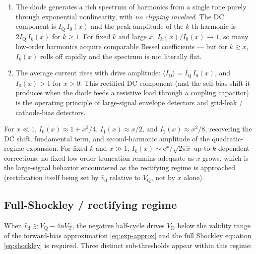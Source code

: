 \documentclass[12pt]{article}
\newcommand{\ID}{I_{\mathrm{D}}}
\newcommand{\VD}{V_{\mathrm{D}}}
\newcommand{\VT}{V_{\mathrm{T}}}
\newcommand{\VQ}{V_{\mathrm{Q}}}
\newcommand{\IQ}{I_{\mathrm{Q}}}
\newcommand{\vhd}{\hat{v}_{\mathrm{d}}}
\newcommand{\eu}{\mathrm{e}}        %
\begin{document}
\begin{enumerate}
    \item The diode generates a rich spectrum of harmonics from a single tone purely through exponential nonlinearity, with \emph{no clipping involved}. The DC component is $\IQ\, I_0(x)$ and the peak amplitude of the $k$-th harmonic is $2\IQ\, I_k(x)$ for $k \geq 1$. For fixed $k$ and large $x$, $I_k(x)/I_0(x) \to 1$, so many low-order harmonics acquire comparable Bessel coefficients --- but for $k \gtrsim x$, $I_k(x)$ rolls off rapidly and the spectrum is not literally flat.
    \item The average current rises with drive amplitude: $\langle \ID \rangle = \IQ\, I_0(x)$, and $I_0(x) > 1$ for $x > 0$. This rectified DC component (and the self-bias shift it produces when the diode feeds a resistive load through a coupling capacitor) is the operating principle of large-signal envelope detectors and grid-leak / cathode-bias detectors.
\end{enumerate}

For $x \ll 1$, $I_0(x) \approx 1 + x^2/4$, $I_1(x) \approx x/2$, and $I_2(x) \approx x^2/8$, recovering the DC shift, fundamental term, and second-harmonic amplitude of the quadratic-regime expansion. For fixed $k$ and $x \gg 1$, $I_k(x) \sim \eu^x/\sqrt{2\pi x}$ up to $k$-dependent corrections; no fixed low-order truncation remains adequate as $x$ grows, which is the large-signal behavior encountered as the rectifying regime is approached (rectification itself being set by $\vhd$ relative to $\VQ$, not by $x$ alone).

\subsection*{Full-Shockley / rectifying regime}

When $\vhd \gtrsim \VQ - 4n\VT$, the negative half-cycle drives $\VD$ below the validity range of the forward-bias approximation \eqref{eq:exp-approx} and the full Shockley equation \eqref{eq:shockley} is required. Three distinct sub-thresholds appear within this regime:
\end{document}
